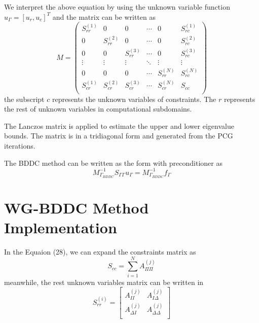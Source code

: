 We interpret the above equation by using the unknown variable function $ u_{\Gamma} = [u_{r}, u_{c}]^{T} $ and the matrix can be written as
\begin{equation}
M = \begin{pmatrix}
S_{rr}^{(1)} & 0 & 0 & \cdots & 0 & S_{rc}^{(1)}\\
0 & S_{rr}^{(2)} & 0 & \cdots & 0 & S_{rc}^{(2)} \\
0 & 0 & S_{rr}^{(3)} & \cdots & 0 & S_{rc}^{(3)} \\
\vdots & \vdots & \vdots & \ddots & \vdots & \vdots \\
0 & 0 & 0 & \cdots & S_{rr}^{(N)} & S_{rc}^{(N)}\\
S_{cr}^{(1)} & S_{cr}^{(2)} & S_{cr}^{(3)} & \cdots & {S_{cr}^{(N)}} & S_{cc} \\
\end{pmatrix}
\end{equation}
the subscript $ c $ represents the unknown variables of constraints. The $ r $ represents the rest of unknown variables in computational subdomains.

The Lanczos matrix is applied to estimate the upper and lower eigenvalue bounds. The matrix is in a tridiagonal form and generated from the PCG iterations.

The BDDC method can be written as the form with preconditioner as
\begin{equation}
M_{\Gamma_{BDDC}}^{-1} S_{\Gamma \Gamma} u_{\Gamma} = M_{\Gamma_{BDDC}}^{-1} f_{\Gamma}
\end{equation}

\section{WG-BDDC Method Implementation}

In the Equaion (28), we can expand the constraints matrix as
\begin{equation}
S_{cc} = \sum_{i=1}^{N} A_{\Pi \Pi}^{(j)}
\end{equation}
meanwhile, the rest unknown variables matrix can be written in
\begin{equation}
S_{rr}^{(i)} = \begin{bmatrix}
A_{II}^{(j)} & A_{I \Delta}^{(j)} \\
A_{\Delta I}^{(j)} & A_{\Delta \Delta}^{(j)}\\
\end{bmatrix}
\end{equation}

